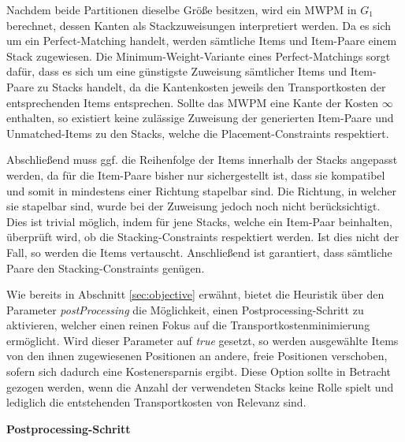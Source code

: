 Nachdem beide Partitionen dieselbe Größe besitzen, wird ein \textsc{MWPM} in $G_1$ berechnet, dessen Kanten als
Stackzuweisungen interpretiert werden. Da es sich um ein Perfect-Matching handelt, werden sämtliche Items und Item-Paare einem Stack zugewiesen. Die Minimum-Weight-Variante eines Perfect-Matchings sorgt dafür, dass es sich um eine günstigste Zuweisung sämtlicher Items und Item-Paare zu Stacks handelt, da die Kantenkosten jeweils den Transportkosten der entsprechenden Items entsprechen. Sollte das \textsc{MWPM} eine Kante der Kosten $\infty$ enthalten, so existiert keine zulässige Zuweisung der generierten Item-Paare und Unmatched-Items zu den Stacks, welche die Placement-Constraints respektiert.

Abschließend muss ggf. die Reihenfolge der Items innerhalb der Stacks angepasst werden, da für die Item-Paare bisher nur sichergestellt ist, dass sie kompatibel und somit in mindestens einer Richtung stapelbar sind. Die Richtung, in welcher sie stapelbar sind, wurde bei der Zuweisung jedoch noch nicht berücksichtigt. Dies ist trivial möglich, indem für jene Stacks, welche ein Item-Paar beinhalten, überprüft wird, ob die Stacking-Constraints respektiert werden. Ist dies nicht der Fall, so werden die Items vertauscht. Anschließend ist garantiert, dass sämtliche Paare den Stacking-Constraints genügen.

Wie bereits in Abschnitt \ref{sec:objective} erwähnt, bietet die Heuristik über den Parameter
\textit{postProcessing} die Möglichkeit, einen Postprocessing-Schritt zu aktivieren, welcher einen reinen Fokus
auf die Transportkostenminimierung ermöglicht. Wird dieser Parameter auf \textit{true} gesetzt, so werden
ausgewählte Items von den ihnen zugewiesenen Positionen an andere, freie Positionen verschoben,
sofern sich dadurch eine Kostenersparnis ergibt. Diese Option sollte in Betracht gezogen werden,
wenn die Anzahl der verwendeten Stacks keine Rolle spielt und lediglich die entstehenden Transportkosten
von Relevanz sind.\newline

\textbf{Postprocessing-Schritt}

